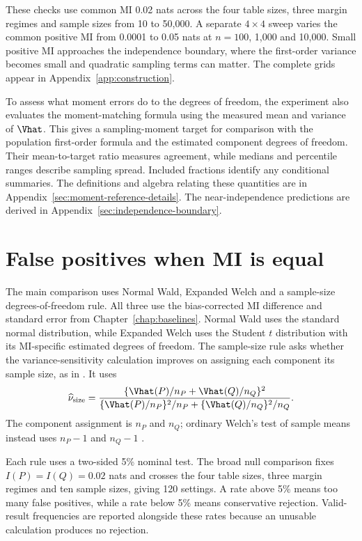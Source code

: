 These checks use common MI 0.02 nats across the four table sizes, three
margin regimes and sample sizes from 10 to 50,000. A separate
\(4\times4\) sweep varies the common positive MI from 0.0001 to 0.05
nats at \(n=100\), 1,000 and 10,000. Small positive MI approaches the
independence boundary, where the first-order variance becomes small and
quadratic sampling terms can matter. The complete grids appear in
Appendix~\ref{app:construction}.

To assess what moment errors do to the degrees of freedom, the experiment
also evaluates the moment-matching formula using the measured mean and
variance of \(\Vhat\). This gives a sampling-moment target for comparison
with the population first-order formula and the estimated component
degrees of freedom. Their mean-to-target ratio measures agreement,
while medians and percentile ranges describe sampling spread. Included
fractions identify any conditional summaries. The definitions and
algebra relating these quantities are in
Appendix~\ref{sec:moment-reference-details}. The near-independence
predictions are derived in Appendix~\ref{sec:independence-boundary}.

\section{False positives when MI is equal}

The main comparison uses Normal Wald, Expanded Welch and a sample-size
degrees-of-freedom rule. All three use the bias-corrected MI difference
and standard error from Chapter~\ref{chap:baselines}. Normal Wald uses
the standard normal distribution, while Expanded Welch uses the Student
\(t\) distribution with its MI-specific estimated degrees of freedom.
The sample-size rule asks whether the variance-sensitivity calculation
improves on assigning each component its sample size, as in
\citet{hutcheson1970}. It uses
\begin{equation}
 \widehat\nu_{\mathrm{size}}=
 \frac{\{\Vhat(P)/n_P+\Vhat(Q)/n_Q\}^{2}}
 {\{\Vhat(P)/n_P\}^{2}/n_P+\{\Vhat(Q)/n_Q\}^{2}/n_Q}.
 \label{eq:redesign-size-df}
\end{equation}
The component assignment is \(n_P\) and \(n_Q\); ordinary Welch's test
of sample means instead uses \(n_P-1\) and \(n_Q-1\)
\citep{welch1947}.

Each rule uses a two-sided 5\% nominal test. The broad null comparison
fixes \(I(P)=I(Q)=0.02\) nats and crosses the four table sizes, three
margin regimes and ten sample sizes, giving 120 settings. A rate above
5\% means too many false positives, while a rate below 5\% means
conservative rejection. Valid-result frequencies are reported alongside
these rates because an unusable calculation produces no rejection.

